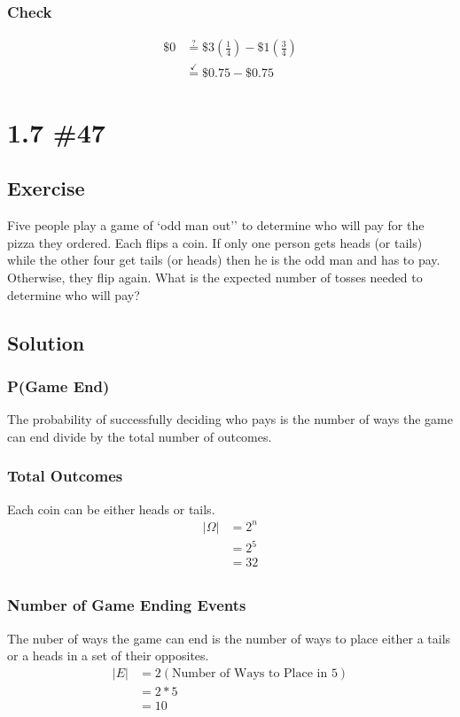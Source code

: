 \documentclass[12pt]{article}
\begin{document}
\subsubsection{Check}
\begin{align*}
\$0 & \stackrel{?}{=} \$3(\frac{1}{4})-\$1(\frac{3}{4})\\
&\stackrel{\checkmark}{=} \$0.75 - \$0.75
\end{align*}


\section{1.7 \#47} 
\subsection{Exercise}
Five people play a game of `odd man out'' to determine who will pay for the pizza they ordered. Each flips a coin. 
If only one person gets heads (or tails) while the other four get tails (or heads) then he is the odd man and has to pay.
Otherwise, they flip again. What is the expected number of tosses needed to determine who will pay?

\subsection{Solution}
\subsubsection{P(Game End)}
The probability of successfully deciding who pays is the number of ways the game can end divide by the total number
of outcomes. 
\subsubsection{Total Outcomes}
Each coin can be either heads or tails.
\begin{align*}
|\Omega|&=2^n\\
&=2^5\\
&=32\\
\end{align*}
\subsubsection{Number of Game Ending Events}
The nuber of ways the game can end is the number of ways to place either a tails or a heads in a set of their opposites.
\begin{align*}
|E|&=2(\text{Number of Ways to Place in 5})\\
&=2*5\\
&=10\\
\end{align*}
\end{document}
